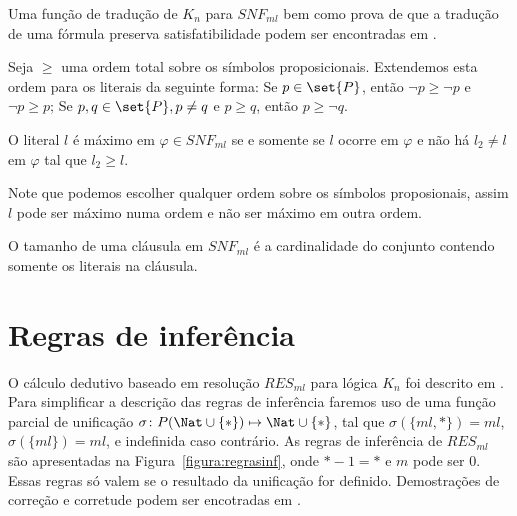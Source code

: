 Uma função de tradução de $K_n$ para $SNF_{ml}$ bem como prova de que a tradução de uma fórmula preserva satisfatibilidade podem ser encontradas em \cite{nalontocl}.

Seja $\ge$ uma ordem total sobre os símbolos proposicionais. Extendemos esta ordem para os literais da seguinte forma: Se $p \in \set{P}$, então $\neg p \ge \neg p$ e $\neg p \ge p$; Se $p, q \in \set{P}, p \not= q$ e $p \ge q$, então $p \ge \neg q$.

\begin{definition}
	O literal $l$ é máximo em $\varphi \in SNF_{ml}$ se e somente se $l$ ocorre em $\varphi$ e não há $l_2 \not= l$ em $\varphi$ tal que $l_2 \ge l$.
\end{definition}

Note que podemos escolher qualquer ordem sobre os símbolos proposionais, assim $l$ pode ser máximo numa ordem e não ser máximo em outra ordem.

\begin{definition}
	O tamanho de uma cláusula em $SNF_{ml}$ é a cardinalidade do conjunto contendo somente os literais na cláusula.
\end{definition}

\section{Regras de inferência} \label{secao:regrasinf}
O cálculo dedutivo baseado em resolução $RES_{ml}$ para lógica $K_n$ foi descrito em \cite{nalontocl}. Para simplificar a descrição das regras de inferência faremos uso de uma função parcial de unificação $\sigma \colon P(\Nat \cup \{*\}) \mapsto \Nat \cup \{*\}$, tal que $\sigma(\{ml, *\}) = ml$, $\sigma(\{ml\}) = ml$, e indefinida caso contrário. As regras de inferência de $RES_{ml}$ são apresentadas na Figura~\ref{figura:regrasinf}, onde $*-1=*$ e $m$ pode ser 0. Essas regras só valem se o resultado da unificação for definido. Demostrações de correção e corretude podem ser encotradas em \cite{nalontocl}.

